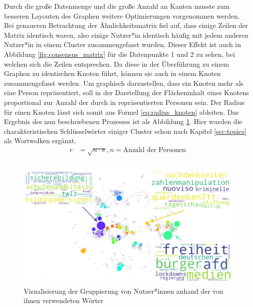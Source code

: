Durch die große Datenmenge und die große  Anzahl an Kanten musste zum besseren Layouten des Graphen weitere Optimierungen vorgenommen werden. Bei genaueren Betrachtung der Ähnlichkeitsmatrix fiel auf, dass einige Zeilen der Matrix identisch waren, also einige Nutzer*in identisch häufig mit jedem anderen Nutzer*in in einem Cluster zusammengefasst wurden. Dieser Effekt ist auch in Abbildung \ref{fig:consensus_matrix} für die Datenpunkte 1 und 2 zu sehen, bei welchen sich die Zeilen entsprechen. Da diese in der Überführung zu einem Graphen zu identischen Knoten führt, können sie auch in einem Knoten zusammengefasst werden. Um graphisch darzustellen, dass ein Knoten mehr als eine Person repräsentiert, soll in der Darstellung der Flächeninhalt eines Knotens proportional zur Anzahl der durch in repräsentierten Personen sein. Der Radius für einen Knoten lässt sich somit aus Formel \ref{eq:radius_knoten} ableiten. Das Ergebnis des nun beschriebenen Prozesses ist als Abbildung \ref{fig:clusters_with_words}. Hier wurden die charakteristischen Schlüsselwörter einiger Cluster schon nach Kapitel \ref{sec:topics} als Wortwolken ergänzt.
\begin{equation}
	\begin{aligned} 
		r&=\sqrt{n\cdot \pi } , n=\text{Anzahl der Personen}\\
	\end{aligned} 
	\label{eq:radius_knoten}
\end{equation}
\begin{figure}[h]
	\centering
	\includegraphics[width=\linewidth]{images/clusters_with_words}
	\caption{Visualisierung der Gruppierung von Nutzer*innen anhand der von ihnen verwendeten Wörter }
	\label{fig:clusters_with_words}
\end{figure}